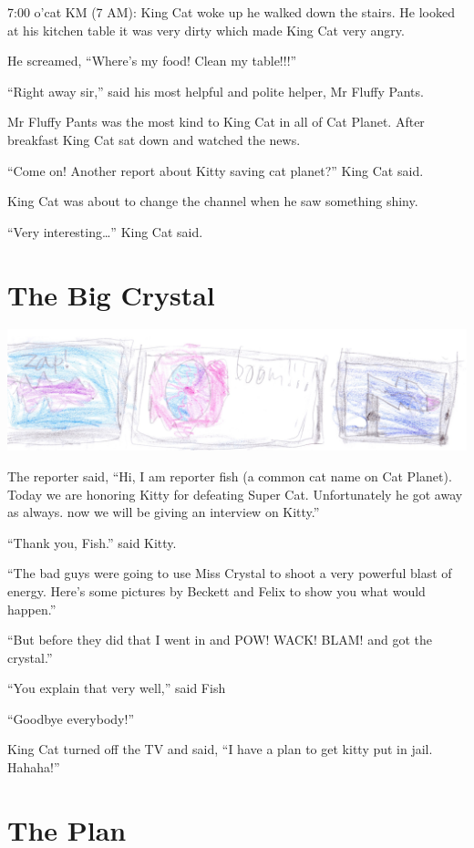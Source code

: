 \documentclass[12pt,oneside]{krantz}
\begin{document}
7:00 o'cat KM (7 AM): King Cat woke up he walked down the stairs. He
looked at his kitchen table it was very dirty which made King Cat very
angry.

He screamed, ``Where's my food! Clean my table!!!''

``Right away sir,'' said his most helpful and polite helper, Mr Fluffy
Pants.

Mr Fluffy Pants was the most kind to King Cat in all of Cat Planet.
After breakfast King Cat sat down and watched the news.

``Come on! Another report about Kitty saving cat planet?'' King Cat
said.

King Cat was about to change the channel when he saw something shiny.

``Very interesting\ldots{}'' King Cat said.

\hypertarget{the-big-crystal}{%
\chapter{The Big Crystal}\label{the-big-crystal}}

\includegraphics{img/boom.jpg}

The reporter said, ``Hi, I am reporter fish (a common cat name on Cat
Planet). Today we are honoring Kitty for defeating Super Cat.
Unfortunately he got away as always. now we will be giving an interview
on Kitty.''

``Thank you, Fish.'' said Kitty.

``The bad guys were going to use Miss Crystal to shoot a very powerful
blast of energy. Here's some pictures by Beckett and Felix to show you
what would happen.''

``But before they did that I went in and POW! WACK! BLAM! and got the
crystal.''

``You explain that very well,'' said Fish

``Goodbye everybody!''

King Cat turned off the TV and said, ``I have a plan to get kitty put in
jail. Hahaha!''

\hypertarget{the-plan}{%
\chapter{The Plan}\label{the-plan}}
\end{document}
